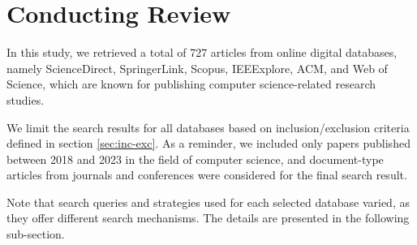 \section{Conducting Review}

In this study, we retrieved a total of 727 articles from online digital databases, namely ScienceDirect, SpringerLink, Scopus, IEEExplore, ACM, and Web of Science, which are known for publishing computer science-related research studies.

We limit the search results for all databases based on inclusion/exclusion criteria defined in section \ref{sec:inc-exc}. As a reminder, we included only papers published between 2018 and 2023 in the field of computer science, and document-type articles from journals and conferences were considered for the final search result.

Note that search queries and strategies used for each selected database varied, as they offer different search mechanisms. The details are presented in the following sub-section.












